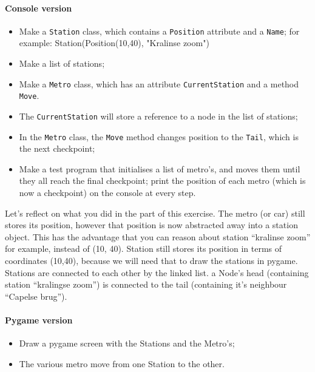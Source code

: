         \paragraph*{Console version}
        \begin{itemize}
            \item Make a \texttt{Station} class,
            which contains a \texttt{Position} attribute and a \texttt{Name};
            for example: Station(Position(10,40), "Kralinse zoom")
            \item Make a list of stations;
            \item Make a \texttt{Metro} class,
            which has an attribute \texttt{CurrentStation} and a method \texttt{Move}.
            \item The \texttt{CurrentStation} will store a reference to a node in the list of stations;
            \item In the \texttt{Metro} class, the \texttt{Move} method changes position to the \texttt{Tail}, which is the next checkpoint;
            \item Make a test program that initialises a list of metro's, and moves them until they all reach the final checkpoint; print the position of each metro (which is now a checkpoint) on the console at every step.
        \end{itemize}

        Let's reflect on what you did in the part of this exercise.
        The metro (or car) still stores its position, however that position is now abstracted away into a station object.
        This has the advantage that you can reason about station ``kralinse zoom'' for example, instead of (10, 40).
        Station still stores its position in terms of coordinates (10,40), because we will need that to draw the stations in pygame.
        Stations are connected to each other by the linked list. a Node's head (containing station ``kralingse zoom'') is connected to the tail (containing it's neighbour ``Capelse brug'').


        \paragraph*{Pygame version}
        \begin{itemize}
            \item Draw a pygame screen with the Stations and the Metro's;
            \item The various metro move from one Station to the other.
        \end{itemize}

